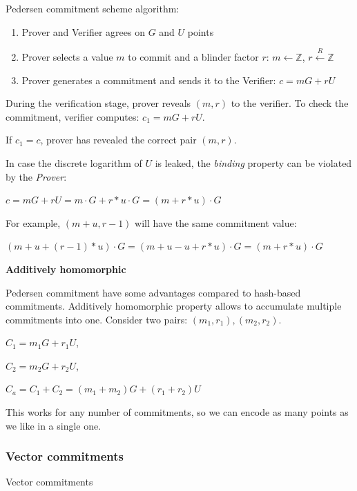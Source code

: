 \documentclass[../lecture-notes.tex]{subfiles}
\begin{document}
Pedersen commitment scheme algorithm:
\begin{enumerate}
    \item Prover and Verifier agrees on $G$ and $U$ points
    \item Prover selects a value $m$ to commit and a blinder factor $r$:
            $m \leftarrow \mathbb{Z}$,
            $r \xleftarrow{R} \mathbb{Z}$
    \item Prover generates a commitment and sends it to the Verifier:
            $c = mG + rU$
\end{enumerate}

During the verification stage, prover reveals $(m, r)$ to the verifier. 
To check the commitment, verifier computes: $c_1 = mG + rU$.

If $c_1 = c$, prover has revealed the correct pair $(m, r)$.

\begin{remark}
    In case the discrete logarithm of $U$ is leaked, the \textit{binding} property can be violated by the \textit{Prover}:

    $c = mG + rU = m \cdot G + r*u \cdot G = (m + r*u) \cdot G$
    
    For example, $(m + u, r - 1)$ will have the same commitment value:

    $(m+u + (r-1)*u) \cdot G = (m + u - u + r*u) \cdot G = (m + r*u) \cdot G$ 
        
\end{remark}

\textbf{Additively homomorphic}

Pedersen commitment have some advantages compared to hash-based commitments.
Additively homomorphic property allows to accumulate multiple commitments into one.
Consider two pairs: $(m_1, r_1), (m_2, r_2)$.

$C_1 = m_1G + r_1U$,

$C_2 = m_2G + r_2U$,

$C_a = C_1 + C_2 = (m_1 + m_2)G + (r_1 + r_2)U$

This works for any number of commitments, so we can encode as many points as we like in a single one.


\subsubsection{Vector commitments}

Vector commitments
\end{document}
